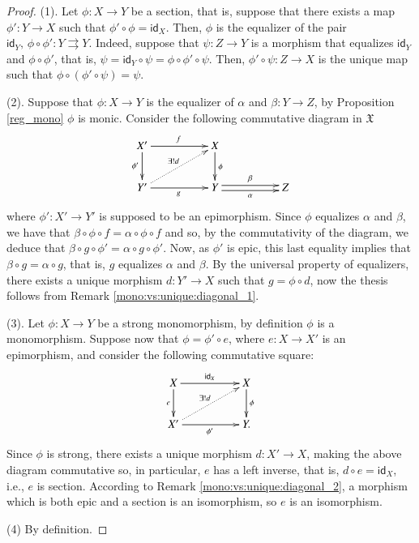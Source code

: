 \documentclass[12pt]{article}
\theoremstyle{definition}
\def\X{\mathfrak X}
\numberwithin{equation}{section}
\newcommand{\id}[1]{\mathsf{id}_{#1}}
\begin{document}
\begin{proof}
(1). Let $\phi\colon X\to Y$ be a section, that is, suppose that there exists a map $\phi'\colon Y\to X$ such that $\phi'\circ \phi=\id X$. Then, $\phi$ is the equalizer of the pair $\id Y,\, \phi\circ\phi'\colon Y\rightrightarrows Y$. Indeed, suppose that $\psi\colon Z\to Y$ is a morphism that equalizes $\id Y$ and $\phi\circ\phi'$, that is, $\psi=\id Y\circ\psi=\phi\circ\phi'\circ \psi$. Then, $\phi'\circ \psi\colon Z\to X$ is the unique map such that $\phi\circ(\phi'\circ \psi)=\psi$.

\smallskip\noindent
(2). Suppose that $\phi\colon X\to Y$ is the equalizer of $\alpha$ and $\beta\colon Y\to Z$, by Proposition \ref{reg_mono} $\phi$ is monic. Consider the following commutative diagram in $\X$
\[
\xymatrix@C=50pt{
X'\ar[d]_-{\phi'}\ar[r]^f&X\ar[d]^{\phi}\\
Y'\ar@{.>}[ur]^{\exists!d}\ar[r]_g&Y\ar@<-.5ex>[r]_-{\alpha} \ar@<.5ex>[r]^-{\beta}&Z}
\]
where $\phi'\colon X'\to Y'$ is supposed to be an epimorphism. Since $\phi$ equalizes $\alpha$ and $\beta$, we have that $\beta\circ\phi\circ f=\alpha\circ\phi\circ f$ and so, by the commutativity of the diagram, we deduce that $\beta\circ g\circ \phi'=\alpha\circ g\circ\phi'$. Now, as $\phi'$ is epic, this last equality implies that $\beta\circ g=\alpha\circ g$, that is, $g$ equalizes $\alpha$ and $\beta$. By the universal property of equalizers, there exists a unique morphism $d\colon Y'\to X$ such that $g=\phi\circ d$, now the thesis follows from Remark \ref{mono:vs:unique:diagonal_1}.

\smallskip\noindent
(3). Let $\phi\colon X\to Y$ be a strong monomorphism, by  definition $\phi$ is a monomorphism. Suppose now that $\phi = \phi' \circ  e$, where $e\colon X\to X'$ is an epimorphism, and consider the following commutative square:
\[
\xymatrix@C=50pt{
X\ar@{>}[r]^{\id X}\ar[d]_-{e}&X\ar[d]^-\phi\\
X'\ar[r]_{\phi'}\ar@{.>}[ur]^{\exists!d}&Y.}
\] 
Since $\phi$ is strong, there exists a unique morphism $d\colon X'\to X$, making the above diagram commutative so, in particular, $e$ has a left inverse, that is, $d\circ e=\id {X}$, i.e., $e$ is section.  According to  Remark \ref{mono:vs:unique:diagonal_2}, 
a morphism which is both epic and a section is an isomorphism, so $e$ is  an isomorphism.


\smallskip\noindent
(4) By definition.
\end{proof} 
\end{document}
